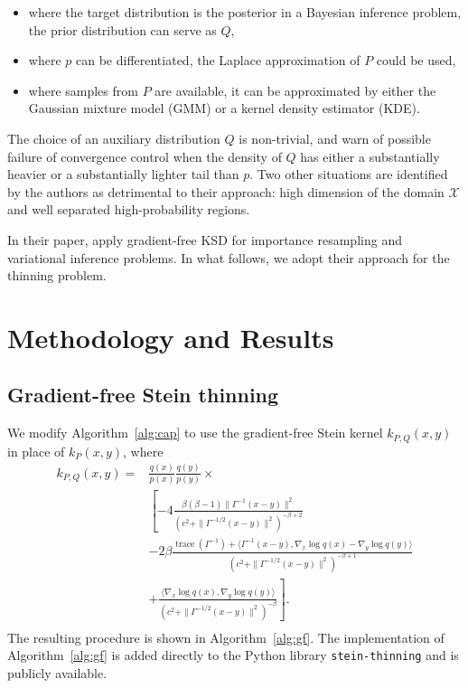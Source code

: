\documentclass[11pt,a4paper]{report}
\DeclareMathOperator{\trace}{trace}
\begin{document}
\begin{itemize}
\item where the target distribution is the posterior in a Bayesian inference problem, the prior distribution can serve as $Q$,
\item where $p$ can be differentiated, the Laplace approximation of $P$ could be used,
\item where samples from $P$ are available, it can be approximated by either the Gaussian mixture model (GMM) or a kernel density estimator (KDE).
\end{itemize}

The choice of an auxiliary distribution $Q$ is non-trivial, and \cite{fisherGradientFreeKernelStein2024} warn of possible failure of convergence control when the density of $Q$ has either a substantially heavier or a substantially lighter tail than $p$. Two other situations are identified by the authors as detrimental to their approach: high dimension of the domain $\mathcal{X}$ and well separated high-probability regions.

In their paper, \cite{fisherGradientFreeKernelStein2024} apply gradient-free KSD for importance resampling and variational inference problems. In what follows, we adopt their approach for the thinning problem.

\chapter{Methodology and Results}
\label{ch:methodology}

\section{Gradient-free Stein thinning}

We modify Algorithm~\ref{alg:cap} to use the gradient-free Stein kernel $k_{P,Q}(x,y)$ in place of $k_P(x, y)$, where
\begin{equation}
\begin{aligned}
k_{P,Q}(x, y)
= &\frac{q(x)}{p(x)} \frac{q(y)}{p(y)} \times \\
 &\left[ -4 \frac{\beta(\beta-1) \| \Gamma^{-1}(x - y)\|^2}{(c^2 + \| \Gamma^{-1/2}(x-y)\|^2)^{-\beta+2}} \right.  \\
&- 2 \beta \frac{\trace(\Gamma^{-1}) + \langle \Gamma^{-1} (x - y), \nabla_x \log q(x) - \nabla_y \log q(y)\rangle}{(c^2 + \| \Gamma^{-1/2}(x-y)\|^2)^{-\beta+1}} \\
& \left. + \frac{\langle \nabla_x \log q(x), \nabla_y \log q(y) \rangle}{(c^2 + \| \Gamma^{-1/2}(x-y)\|^2)^{-\beta}} \right]. \\
\label{eq:k_Q}
\end{aligned}
\end{equation}
The resulting procedure is shown in Algorithm~\ref{alg:gf}. The implementation of Algorithm~\ref{alg:gf} is added directly to the Python library \texttt{stein-thinning} and is publicly available.
\end{document}

